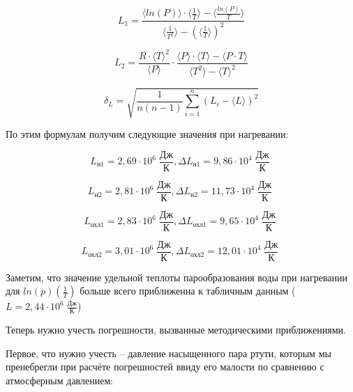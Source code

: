 \begin{equation}
	L_1 = \frac{\langle ln(P) \rangle \cdot \langle \frac{1}{T} \rangle - \langle \frac{ln(P)}{T} \rangle}{\langle \frac{1}{T^2} \rangle  - \left( \langle \frac{1}{T} \rangle  \right)^2}
\end{equation}

\begin{equation}
	L_2 = \frac{R\cdot \langle T \rangle^2}{\langle P \rangle}\cdot\frac{\langle P \rangle \cdot \langle T \rangle - \langle P\cdot T \rangle}{\langle T^2 \rangle  -  \langle T \rangle^2}
\end{equation}


\begin{equation}
	\delta_{L} = \sqrt{\frac{1}{n(n-1)}\sum_{i=1}^n(L_i - \langle L\rangle)^2}
\end{equation}

По этим формулам получим следующие значения при нагревании:

\begin{equation}
	L_{\text{н}1} = 2,69 \cdot 10^6 \; \frac{\text{Дж}}{\text{К}}, \Delta L_{\text{н}1} = 9,86 \cdot 10^4 \; \frac{\text{Дж}}{\text{К}}\;
\end{equation}

\begin{equation}
	L_{\text{н}2} = 2,81 \cdot 10^6 \; \frac{\text{Дж}}{\text{К}}, \Delta L_{\text{н}2} = 11,73 \cdot 10^4 \; \frac{\text{Дж}}{\text{К}}\;
\end{equation}

\begin{equation}
	L_{\text{охл}1} = 2,83 \cdot 10^6 \; \frac{\text{Дж}}{\text{К}}, \Delta L_{\text{охл}1} = 9,65 \cdot 10^4 \; \frac{\text{Дж}}{\text{К}}\; 
\end{equation}

\begin{equation}
	L_{\text{охл}2} = 3,01 \cdot 10^6 \; \frac{\text{Дж}}{\text{К}}, \Delta L_{\text{охл}2} = 12,01 \cdot 10^4 \; \frac{\text{Дж}}{\text{К}}\; 
\end{equation}

Заметим, что значение удельной теплоты парообразования воды при нагревании для $ln(p)(\frac{1}{T})$ больше всего приближенна к табличным данным ($L = 2,44 \cdot 10^6 \; \frac{\text{Дж}}{\text{К}}$)

Теперь нужно учесть погрешности, вызванные методическими приближениями. 

Первое, что нужно учесть -- давление насыщенного пара ртути, которым мы пренебрегли при расчёте погрешностей ввиду его малости по сравнению с атмосферным давлением:

